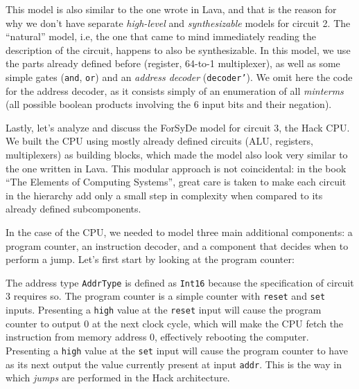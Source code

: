             This model is also similar to the one wrote in Lava, and that is the reason for why we
            don't have separate \emph{high-level} and \emph{synthesizable} models for circuit 2. The
            ``natural'' model, i.e, the one that came to mind immediately reading the description of
            the circuit, happens to also be synthesizable. In this model, we use the parts already
            defined before (register, 64-to-1 multiplexer), as well as some simple gates
            (\texttt{and}, \texttt{or}) and an \emph{address decoder} (\texttt{decoder'}). We omit
            here the code for the address decoder, as it consists simply of an enumeration of all
            \emph{minterms} (all possible boolean products involving the 6 input bits and their
            negation).

            Lastly, let's analyze and discuss the ForSyDe model for circuit 3, the Hack CPU. We
            built the CPU using mostly already defined circuits (ALU, registers, multiplexers) as
            building blocks, which made the model also look very similar to the one written in Lava.
            This modular approach is not coincidental: in the book ``The Elements of Computing
            Systems''\cite{nand2tetris-book}, great care is taken to make each circuit in the
            hierarchy add only a small step in complexity when compared to its already defined
            subcomponents.

            In the case of the CPU, we needed to model three main additional components: a program
            counter, an instruction decoder, and a component that decides when to perform a jump.
            Let's first start by looking at the program counter:


            The address type \texttt{AddrType} is defined as \texttt{Int16} because the
            specification of circuit 3 requires so. The program counter is a simple counter with
            \texttt{reset} and \texttt{set} inputs. Presenting a \texttt{high} value at the
            \texttt{reset} input will cause the program counter to output 0 at the next clock cycle,
            which will make the CPU fetch the instruction from memory address 0, effectively
            rebooting the computer. Presenting a \texttt{high} value at the \texttt{set} input will
            cause the program counter to have as its next output the value currently present at
            input \texttt{addr}. This is the way in which \emph{jumps} are performed in the Hack
            architecture.

